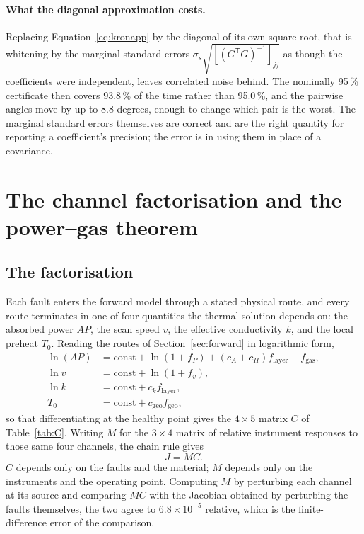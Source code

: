 \documentclass[preprint,12pt]{elsarticle}
\begin{document}
\paragraph{What the diagonal approximation costs.} Replacing
Equation~\eqref{eq:kronapp} by the diagonal of its own square root, that is
whitening by the marginal standard errors
$\sigma_s \sqrt{[(G^{\mathsf T}G)^{-1}]_{jj}}$ as though the coefficients were
independent, leaves correlated noise behind. The nominally 95\,\% certificate
then covers 93.8\,\% of the time rather than 95.0\,\%, and the pairwise angles
move by up to 8.8 degrees, enough to change which pair is the worst. The
marginal standard errors themselves are correct and are the right quantity for
reporting a coefficient's precision; the error is in using them in place of a
covariance.


\section{The channel factorisation and the power--gas theorem}
\label{app:channels}

\subsection{The factorisation}

Each fault enters the forward model through a stated physical route, and every
route terminates in one of four quantities the thermal solution depends on: the
absorbed power $AP$, the scan speed $v$, the effective conductivity $k$, and the
local preheat $T_0$. Reading the routes of Section~\ref{sec:forward} in
logarithmic form,
%
\begin{align}
\ln(AP) &= \mathrm{const} + \ln(1+f_P) + (c_A + c_H) f_{\mathrm{layer}}
           - f_{\mathrm{gas}} , \\
\ln v   &= \mathrm{const} + \ln(1+f_v) , \\
\ln k   &= \mathrm{const} + c_k f_{\mathrm{layer}} , \\
T_0     &= \mathrm{const} + c_{\mathrm{geo}} f_{\mathrm{geo}} ,
\end{align}
%
so that differentiating at the healthy point gives the $4 \times 5$ matrix $C$
of Table~\ref{tab:C}. Writing $M$ for the $3 \times 4$ matrix of relative
instrument responses to those same four channels, the chain rule gives
%
\begin{equation}
J = M C .
\end{equation}
%
$C$ depends only on the faults and the material; $M$ depends only on the
instruments and the operating point. Computing $M$ by perturbing each channel at
its source and comparing $MC$ with the Jacobian obtained by perturbing the
faults themselves, the two agree to $6.8 \times 10^{-5}$ relative, which is the
finite-difference error of the comparison.
\end{document}
